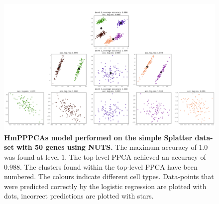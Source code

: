 \begin{figure}
    \centering
    \includegraphics[width=\linewidth]{figs/simple_50_nuts.png}
    \caption[HmPPPCAs model performed on the simple Splatter data-set with 50 genes using NUTS]{\small \textbf{HmPPPCAs model performed on the simple Splatter data-set with 50 genes using NUTS.} \small The maximum accuracy of $1.0$ was found at level $1$. The top-level PPCA achieved an accuracy of $0.988$. The clusters found within the top-level PPCA have been numbered. The colours indicate different cell types. Data-points that were predicted correctly by the logistic regression are plotted with dots, incorrect predictions are plotted with stars.}
    \label{fig:simple_50_nuts}
\end{figure}

